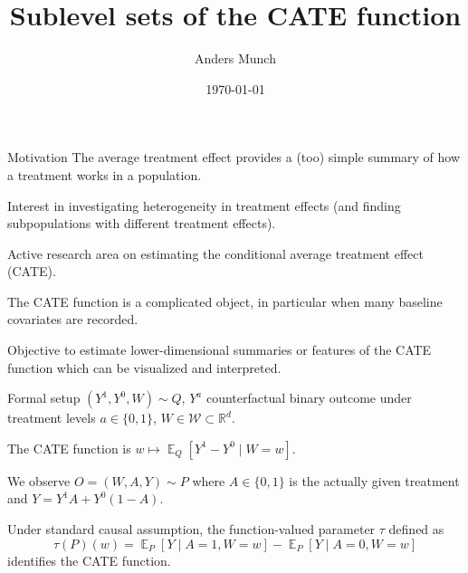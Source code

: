 \documentclass[smaller, aspectratio=169]{beamer}\usepackage{listings}
\author{Anders Munch}
\date{\today}
\title{Sublevel sets of the CATE function}
\newcommand{\E}{{\ensuremath{\mathop{{\mathbb{E}}}}}}
\newcommand{\R}{\mathbb{R}}
\newcommand{\1}{\mathds{1}}
\begin{document}
\maketitle

\begin{frame}[label={sec:org8b3a733}]{Motivation}
The average treatment effect provides a (too) simple summary of how a
treatment works in a population.

\vfill

Interest in investigating heterogeneity in treatment effects (and
finding subpopulations with different treatment effects).

\vfill

Active research area on estimating the conditional average treatment
effect (CATE).

\vfill

The CATE function is a complicated object, in particular when many
baseline covariates are recorded.

\vfill

Objective to estimate lower-dimensional \color{bblue}summaries
\color{black} or \color{bblue}features \color{black} of the CATE
function which can be visualized and interpreted.
\end{frame}

\begin{frame}[label={sec:org24560bc}]{Formal setup}
\( (Y^1, Y^0, W) \sim Q \), \( Y^a \) counterfactual binary outcome
under treatment levels \( a \in \{0,1\} \),
$ W \in \mathcal{W} \subset \R^d$.

\vfill

The CATE function is \(   w \mapsto \E_Q{\left[ Y^1 - Y^0 \mid W=w \right]} \).

\vfill

We observe \( O = (W, A, Y) \sim P \) where \( A \in \{0,1\} \) is the
actually given treatment and \( Y= Y^1 A + Y^0 (1-A) \).

\vfill

Under standard causal assumption, the function-valued parameter $\tau$
defined as
\begin{equation*}
  \tau(P)(w) = \E_P{[Y \mid A=1, W=w]} - \E_P{[Y \mid A=0, W=w]} 
\end{equation*}
identifies the CATE function.
\end{frame}
\end{document}
